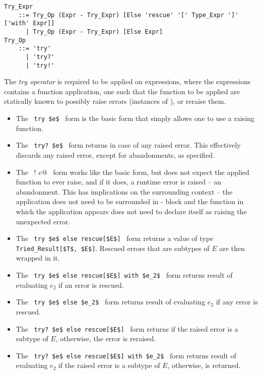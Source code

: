\grammar\begin{lstlisting}
Try_Expr 
    ::= Try_Op (Expr - Try_Expr) [Else 'rescue' '[' Type_Expr ']' ['with' Expr]]
      | Try_Op (Expr - Try_Expr) [Else Expr]
Try_Op
    ::= 'try'
      | 'try?'
      | 'try!'
\end{lstlisting}

The {\em try operator} is required to be applied on expressions, where the expressions contains a function application, one such that the function to be applied are statically known to possibly raise errors (instances of ), or reraise them. 

\begin{itemize}
  \item The ~\lstinline!try $e$!~ form is the basic form that simply allows one to use a raising function. 

  \item The ~\lstinline!try? $e$!~ form returns  in case of any raised error. This effectively discards any raised error, except for abandonments, as specified. 

  \item The ~\lstinline@try! $e$@~ form works like the basic form, but does not expect the applied function to ever raise, and if it does, a runtime error is raised -- an abandonment. This has implications on the surrounding context -- the application does not need to be surrounded in - block and the function in which the application appears does not need to declare itself as raising the unexpected error. 

  \item The ~\lstinline!try $e$ else rescue[$E$]!~ form returns a value of type \lstinline!Tried_Result[$T$, $E$]!. Rescued errors that are subtypes of $E$ are then wrapped in it.
    
  \item The ~\lstinline!try $e$ else rescue[$E$] with $e_2$!~ form returns result of evaluating $e_2$ if an error is rescued. 
      
  \item The ~\lstinline!try $e$ else $e_2$!~ form returns result of evaluating $e_2$ if any error is rescued. 
 
  \item The ~\lstinline!try? $e$ else rescue[$E$]!~ form returns  if the raised error is a subtype of $E$, otherwise, the error is reraised. 
      
  \item The ~\lstinline!try? $e$ else rescue[$E$] with $e_2$!~ form returns result of evaluating $e_2$ if the raised error is a subtype of $E$, otherwise,  is returned. 
        

\end{itemize}
